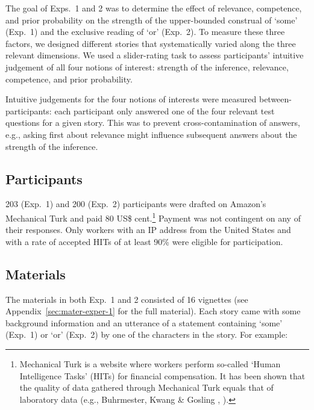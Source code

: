 \documentclass[12pt]{article}
\begin{document}
The goal of Exps.\ 1 and 2 was to determine the effect of relevance, competence, and prior probability on the strength of the upper-bounded construal of `some' (Exp.\ 1) and the exclusive reading of `or' (Exp.\ 2). To measure these three factors, we designed different stories that systematically varied along the three relevant dimensions. We used a slider-rating task to assess participants' intuitive judgement of all four notions of interest: strength of the inference, relevance, competence, and prior probability.

Intuitive judgements for the four notions of interests were measured between-participants: each participant only answered one of the four relevant test questions for a given story. This was to prevent cross-contamination of answers, e.g., asking first about relevance might influence subsequent answers about the strength of the inference.

\subsection*{Participants}

203 (Exp.\ 1) and 200 (Exp.\ 2) participants were drafted on Amazon's Mechanical Turk and paid 80 US\$ cent.\footnote{Mechanical Turk is a website where workers perform so-called `Human Intelligence Tasks' (HITs) for financial compensation. It has been shown that the quality of data gathered through Mechanical Turk equals that of laboratory data (e.g., Buhrmester, Kwang \& Gosling \citeyear{buhrmester2011}, \citealt{schnoebelen2010, sprouse2011}).} Payment was not contingent on any of their responses. Only workers with an IP address from the United States and with a rate of accepted HITs of at least 90\% were eligible for participation.

\subsection*{Materials}

The materials in both Exp.\ 1 and 2 consisted of 16 vignettes (see
Appendix~\ref{sec:mater-exper-1} for the full material). Each story came with some background information and an utterance of a statement containing `some' (Exp.\ 1) or `or' (Exp.\ 2) by one of the characters in the story. For example:
\end{document}

